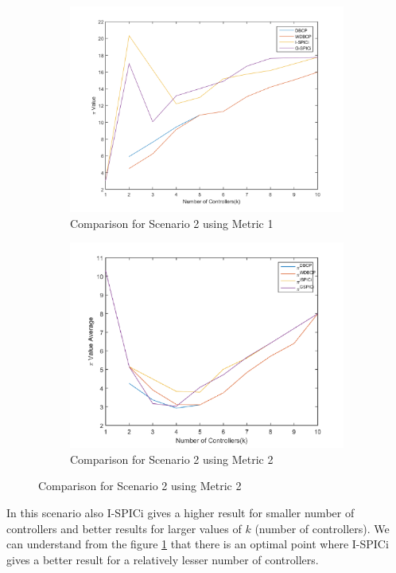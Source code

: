 \documentclass[10pt]{extarticle}
\begin{document}
	\begin{figure}
		\begin{subfigure}{0.5\linewidth}
			\includegraphics[width=\linewidth]{comparison_2.png}
			\caption{Comparison for Scenario 2 using Metric 1}
			\label{fig:comp2}
		\end{subfigure}
		\begin{subfigure}{0.5\linewidth}
			\includegraphics[width=\linewidth]{our_comp_2.png}
			\caption{Comparison for Scenario 2 using Metric 2}
			\label{fig:ourcomp2}
		\end{subfigure}
	\end{figure}
	In this scenario also I-SPICi gives a higher result for smaller number of controllers and better results for larger values of $k$ (number of controllers). We can understand from the figure \ref{fig:comp2} that there is an optimal point where I-SPICi gives a better result for a relatively lesser number of controllers.
	
\end{document}
